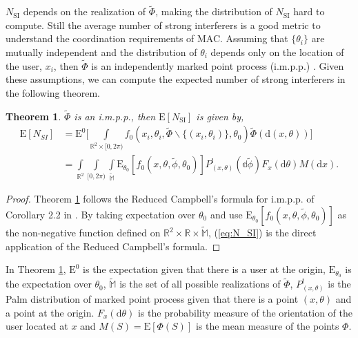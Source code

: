 \documentclass[10pt, conference, letterpaper]{IEEEtran}
\newtheorem{theorem}{Theorem}
\begin{document}
$N_{\mathrm{SI}}$ depends on the realization of $\tilde{\Phi}$, making the distribution of $N_{\mathrm{SI}}$ hard to compute. 
Still the average number of strong interferers is a good metric to understand the coordination requirements of MAC.
Assuming that $\{\theta_i\}$ are mutually independent and the distribution of $\theta_i$ depends only on the location of the user, $x_i$, then $\tilde{\Phi}$ is an independently marked point process (i.m.p.p.) \cite{stochasticgeometry}. 
Given these assumptions, we can compute the expected number of strong interferers in the following theorem.
\begin{theorem}\label{theorem:E_N_SI}
	$\tilde{\Phi}$ is an i.m.p.p., then $\mathrm{E}[N_{\mathrm{SI}}]$ is given by,
	\begin{equation} \label{eq:N_SI}
	\begin{split}
	\mathrm{E}[N_{SI}] &= \mathrm{E}^0\bigg[\int\limits_{\mathbb{R}^2\times[0,2\pi)}f_0(x_i, \theta_i, \tilde{\Phi}\backslash\{(x_i,\theta_i)\}, \theta_0)\tilde{\Phi}(\mathrm{d}(x,\theta)) \bigg]\\
	&= \int\limits_{\mathbb{R}^2}\int\limits_{[0,2\pi)}\int\limits_{\mathbb{\tilde{M}}}\mathrm{E}_{\theta_0}[f_0(x,\theta,\tilde{\phi}, \theta_0)]P_{(x,\theta)}^{!}(\mathbb{d}\tilde{\phi})F_x(\mathrm{d}\theta)M(\mathrm{d}x).
	\end{split}
	\end{equation}	
\end{theorem}
\begin{proof}
	Theorem \ref{theorem:E_N_SI} follows the Reduced Campbell's formula for i.m.p.p. of Corollary 2.2 in \cite{stochasticgeometry}. By taking expectation over $\theta_0$ and use $\mathrm{E}_{\theta_0}[f_0(x,\theta,\tilde{\phi}, \theta_0)]$ as the non-negative function defined on $\mathbb{R}^2\times \mathbb{R}\times \mathbb{\tilde{M}}$, (\ref{eq:N_SI}) is the direct application of the Reduced Campbell's formula.
\end{proof}

In Theorem \ref{theorem:E_N_SI}, $\mathrm{E}^0$ is the expectation given that there is a user at the origin, $\mathrm{E}_{\theta_0}$ is the expectation over $\theta_0$, $\mathbb{\tilde{M}}$ is the set of all possible realizations of $\tilde{\Phi}$, $P_{(x,\theta)}^!$ is the Palm distribution of marked point process given that there is a point $(x, \theta)$ and a point at the origin. $F_x(\mathrm{d}\theta)$ is the probability measure of the orientation of the user located at $x$ and $M(S)=\mathrm{E}[\Phi(S)]$ is the mean measure of the points $\Phi$.
\end{document}
